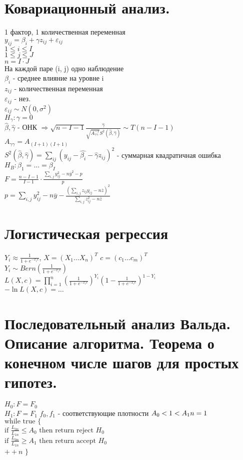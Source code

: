 \documentclass{article}
\newcommand\0{\mathbb{0}}
\newcommand\1{\mathbb{1}}
\newcommand{\Rto}{\Rightarrow}
\begin{document}
\section{Ковариационный анализ.}
1 фактор, 1 количественная переменная\\
$y_{ij} = \beta_i + \gamma z_{ij} + \varepsilon_{ij}$\\
$1 \leq i \leq I$\\
$1 \leq j \leq J$\\
$n = I \cdot J$\\
На каждой паре (i, j) одно наблюдение\\
$\beta_i$ - среднее влияние на уровне i\\
$z_{ij}$ - количественная переменная\\
$\varepsilon_{ij}$ - нез.\\
$\varepsilon_{ij} \sim N(0, \sigma^2)$\\
$H_\gamma: \gamma = 0$\\
$\widehat{\beta}, \widehat{\gamma}$ - ОНК $\Rto \sqrt{n - I - 1}\frac{\widehat{\gamma}}{\sqrt{A^{-1}_{\gamma\gamma}}S^2(\widehat{\beta}, \widehat{\gamma})} \sim T(n - I - 1)$\\
$A_{\gamma\gamma} = A_{(I + 1)(I + 1)}$\\
$S^2(\widehat{\beta}, \widehat{\gamma}) = \displaystyle\sum_{ij}(y_{ij} - \widehat{\beta_i} - \widehat{\gamma}z_{ij})^2$ - суммарная квадратичная ошибка\\
$H_B: \beta_1 = \dots = \beta_I$\\
$F = \frac{n - I - 1}{I - 1} \cdot \frac{\displaystyle\sum_{i,j} y^2_{ij} - n\overline{y}^2 - p}{p}$\\
$p = \displaystyle\sum_{i,j}y^2_{ij} - n\overline{y} - \frac{(\displaystyle\sum_{i,j}z_{ij}y_{ij} - n\overline{z})^2}{\displaystyle\sum_{i,j}z^2_{ij} - n\overline{z}}$
\section{Логистическая регрессия}
$Y_i \approx \frac{1}{1 + e^{-x_ic}}$, $X = (X_1 \dots X_n)^T$ $c = (c_1 \dots c_m)^T$\\
$Y_i \sim Bern(\frac{1}{1 + e^{-x_ic}})$\\
$L(X, c) = \displaystyle\prod_{i = 1}^n(\frac{1}{1 + e^{-x_ic}})^{Y_i}(1 - \frac{1}{1 + e^{-x_ic}})^{1 - Y_i}$\\
$-\ln{L(X, c)} = \dots$\\
\section{Последовательный анализ Вальда. Описание алгоритма. Теорема о конечном числе шагов
для простых гипотез.}
$H_0: F = F_0$\\
$H_1: F = F_1$
$f_0, f_1$ - соответствующие плотности
$A_0 < 1 < A_1\\
n = 1$\\
$\text{while true }\{$\\
$\text{if }\frac{L_{0n}}{L_{1n}} \leq A_0 \text{ then return reject }H_0$\\
$\text{if }\frac{L_{0n}}{L_{1n}} \geq A_1 \text{ then return accept }H_0$\\
$++n$
$\}$
\end{document}
